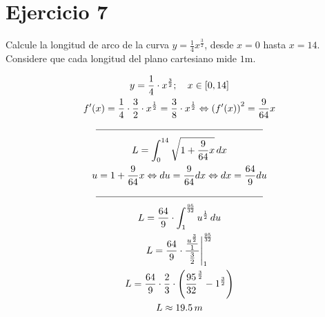 \section*{Ejercicio 7}
\noindent Calcule la longitud de arco de la curva \(y = \frac{1}{4} x^\frac{3}{2}\), desde \(x = 0 \) hasta \(x = 14 \). Considere que cada longitud del plano cartesiano mide \(1\)m.

\begin{gather*}
  y = \frac{1}{4} \cdot x^\frac{3}{2}; \quad x \in [0, 14] \\
  f'(x) = \frac{1}{4} \cdot \frac{3}{2} \cdot x^\frac{1}{2} = \frac{3}{8} \cdot x^\frac{1}{2} \Leftrightarrow %
    \left( f'(x) \right)^2 = \frac{9}{64} x \\
  \rule{0.5\textwidth}{0.4pt} \\
  L = \int_0^{14} \sqrt{1 + \frac{9}{64} x} \, dx \\
  u = 1 + \frac{9}{64} x \Leftrightarrow %
    du = \frac{9}{64} dx \Leftrightarrow %
    dx = \frac{64}{9} du \\
  \rule{0.5\textwidth}{0.4pt} \\
  L = \frac{64}{9} \cdot \int_{1}^{\frac{95}{32}} u^\frac{1}{2} \, du \\
  L = \frac{64}{9} \cdot \frac{\frac{u^\frac{3}{2}}{1}}{\frac{3}{2}} \Bigg|_{1}^{\frac{95}{32}} \\
  L = \frac{64}{9} \cdot \frac{2}{3} \cdot \left( \frac{95}{32}^\frac{3}{2} - 1^\frac{3}{2} \right) \\
  L \approx 19.5 \, m
\end{gather*}